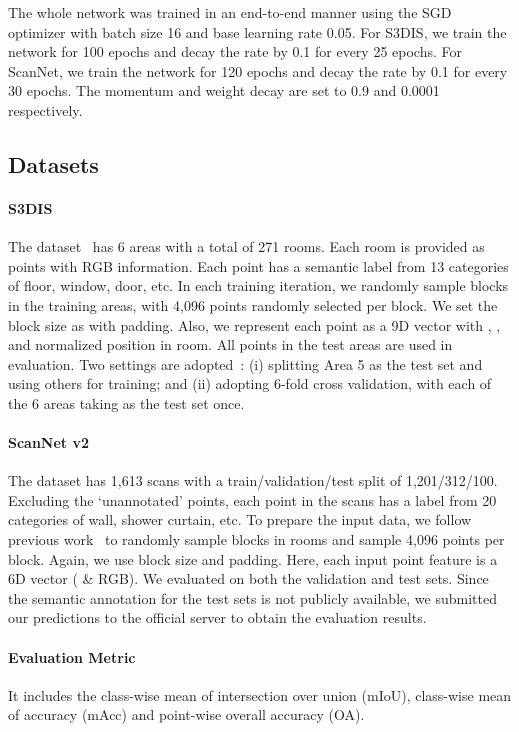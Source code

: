 \documentclass[10pt,twocolumn,letterpaper]{article}
\begin{document}
The whole network was trained in an end-to-end manner using the SGD optimizer with batch size 16 and base learning rate 0.05. For S3DIS, we train the network for 100 epochs and decay the rate by 0.1 for every 25 epochs. For ScanNet, we train the network for 120 epochs and decay the rate by 0.1 for every 30 epochs. The momentum and weight decay are set to 0.9 and 0.0001 respectively. 

\subsection{Datasets}

\paragraph{S3DIS}
The dataset~\cite{s3dis} has 6 areas with a total of 271 rooms.
Each room is provided as points with RGB information.
Each point has a semantic label from 13 categories of floor, window, door, etc.
In each training iteration, we randomly sample blocks in the training areas, with 4,096 points randomly selected per block. We set the block size as  with  padding.
Also, we represent each point as a 9D vector with , , and normalized position in room.
All points in the test areas are used in evaluation.
Two settings are adopted~\cite{segcloud, spg, pointcnn}: (i) splitting Area 5 as the test set and using others for training; and (ii) adopting 6-fold cross validation, with each of the 6 areas taking as the test set once. 

\vspace{-0.12in}
\paragraph{ScanNet v2} 
The dataset has 1,613 scans with a train/validation/test split of 1,201/312/100. Excluding the `unannotated' points, each point in the scans has a label from 20 categories of wall, shower curtain, etc. To prepare the input data, we follow previous work~\cite{pointnet2} to randomly sample blocks in rooms and sample 4,096 points per block.
Again, we use  block size and  padding.
Here, each input point feature is a 6D vector ( \& RGB).
We evaluated on both the validation and test sets.
Since the semantic annotation for the test sets is not publicly available, we submitted our predictions to the official server to obtain the evaluation results.

\vspace{-0.12in}
\paragraph{Evaluation Metric}
It includes the class-wise mean of intersection over union (mIoU), class-wise mean of accuracy (mAcc) and point-wise overall accuracy (OA). 
\end{document}
